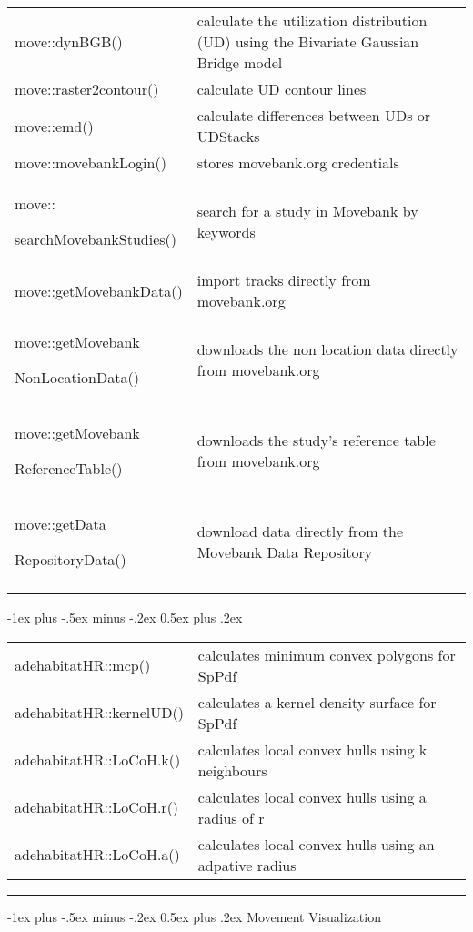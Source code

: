 \documentclass[a4paper,10pt,landscape]{article}
\makeatletter
\renewcommand{\section}{\@startsection{section}{1}{0mm}%
                                {-1ex plus -.5ex minus -.2ex}%
                                {0.5ex plus .2ex}%
                                {\normalfont\large\bfseries}}
\makeatother
\begin{document}
\begin{multicols}{3}
\begin{tabular}{@{}p{\the\MyLen}%
                @{}p{\linewidth-\the\MyLen}@{}}
move::dynBGB() &  calculate the utilization distribution (UD) using the Bivariate Gaussian Bridge model\\
move::raster2contour() & calculate UD contour lines \\
move::emd() & calculate differences between UDs or UDStacks\\
move::movebankLogin() & stores movebank.org credentials \\
move::\par searchMovebankStudies() & search for a study in Movebank by keywords\\
move::getMovebankData() & import tracks directly from movebank.org \\
move::getMovebank\par
NonLocationData() & downloads the non location data directly from movebank.org\\
move::getMovebank\par
ReferenceTable() & downloads the study's reference table from movebank.org\\
move::getData\par
RepositoryData() & download data directly from the Movebank Data Repository\\
& 
\end{tabular}

\section{}
\begin{tabular}{@{}p{\the\MyLen}%
                @{}p{\linewidth-\the\MyLen}@{}}
adehabitatHR::mcp() & calculates minimum convex polygons for SpPdf \\
adehabitatHR::kernelUD() & calculates a kernel density surface for SpPdf \\
adehabitatHR::LoCoH.k() & calculates local convex hulls using k neighbours \\
adehabitatHR::LoCoH.r() & calculates local convex hulls using a radius of r \\
adehabitatHR::LoCoH.a() & calculates local convex hulls using an adpative radius \\
\end{tabular}


\quad
\rule{0.32\textwidth}{0.4pt}
\section{Movement Visualization}


\end{multicols}
\end{document}
